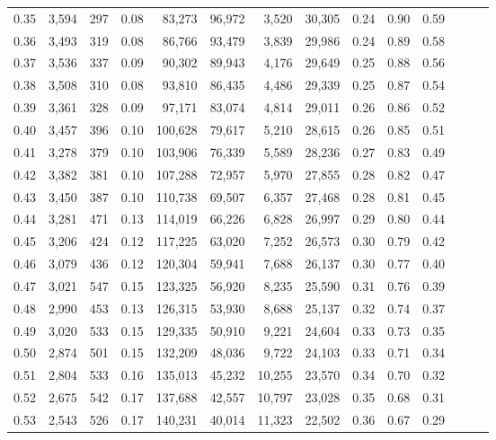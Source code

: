 \begin{tabular}{rrrrrrrrrrrrrr}
0.35 &  3,594 &  297 &  0.08 &   83,273 &   96,972 &   3,520 &  30,305 &  0.24 &  0.90 &      0.59 \\
0.36 &  3,493 &  319 &  0.08 &   86,766 &   93,479 &   3,839 &  29,986 &  0.24 &  0.89 &      0.58 \\
0.37 &  3,536 &  337 &  0.09 &   90,302 &   89,943 &   4,176 &  29,649 &  0.25 &  0.88 &      0.56 \\
0.38 &  3,508 &  310 &  0.08 &   93,810 &   86,435 &   4,486 &  29,339 &  0.25 &  0.87 &      0.54 \\
0.39 &  3,361 &  328 &  0.09 &   97,171 &   83,074 &   4,814 &  29,011 &  0.26 &  0.86 &      0.52 \\
0.40 &  3,457 &  396 &  0.10 &  100,628 &   79,617 &   5,210 &  28,615 &  0.26 &  0.85 &      0.51 \\
0.41 &  3,278 &  379 &  0.10 &  103,906 &   76,339 &   5,589 &  28,236 &  0.27 &  0.83 &      0.49 \\
0.42 &  3,382 &  381 &  0.10 &  107,288 &   72,957 &   5,970 &  27,855 &  0.28 &  0.82 &      0.47 \\
0.43 &  3,450 &  387 &  0.10 &  110,738 &   69,507 &   6,357 &  27,468 &  0.28 &  0.81 &      0.45 \\
0.44 &  3,281 &  471 &  0.13 &  114,019 &   66,226 &   6,828 &  26,997 &  0.29 &  0.80 &      0.44 \\
0.45 &  3,206 &  424 &  0.12 &  117,225 &   63,020 &   7,252 &  26,573 &  0.30 &  0.79 &      0.42 \\
0.46 &  3,079 &  436 &  0.12 &  120,304 &   59,941 &   7,688 &  26,137 &  0.30 &  0.77 &      0.40 \\
0.47 &  3,021 &  547 &  0.15 &  123,325 &   56,920 &   8,235 &  25,590 &  0.31 &  0.76 &      0.39 \\
0.48 &  2,990 &  453 &  0.13 &  126,315 &   53,930 &   8,688 &  25,137 &  0.32 &  0.74 &      0.37 \\
0.49 &  3,020 &  533 &  0.15 &  129,335 &   50,910 &   9,221 &  24,604 &  0.33 &  0.73 &      0.35 \\
0.50 &  2,874 &  501 &  0.15 &  132,209 &   48,036 &   9,722 &  24,103 &  0.33 &  0.71 &      0.34 \\
0.51 &  2,804 &  533 &  0.16 &  135,013 &   45,232 &  10,255 &  23,570 &  0.34 &  0.70 &      0.32 \\
0.52 &  2,675 &  542 &  0.17 &  137,688 &   42,557 &  10,797 &  23,028 &  0.35 &  0.68 &      0.31 \\
0.53 &  2,543 &  526 &  0.17 &  140,231 &   40,014 &  11,323 &  22,502 &  0.36 &  0.67 &      0.29 \\

\end{tabular}
